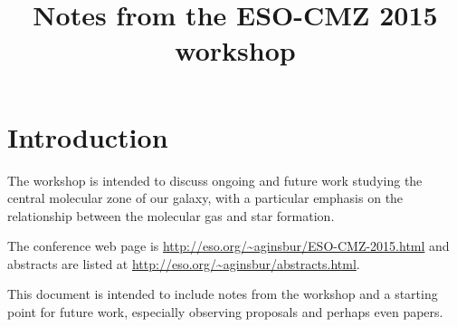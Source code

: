 \title{Notes from the ESO-CMZ 2015 workshop}
\section{Introduction}
The workshop is intended to discuss ongoing and future work studying the central molecular zone of our galaxy, with a particular emphasis on the relationship between the molecular gas and star formation.

The conference web page is \url{http://eso.org/~aginsbur/ESO-CMZ-2015.html} and abstracts are listed at \url{http://eso.org/~aginsbur/abstracts.html}.  

This document is intended to include notes from the workshop and a starting point for future work, especially observing proposals and perhaps even papers.